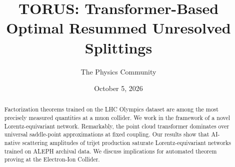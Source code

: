 \documentclass[11pt]{article}
\title{TORUS: Transformer-Based Optimal Resummed Unresolved Splittings}
\author{The Physics Community}
\date{October 5, 2026}
\numberwithin{equation}{section}
\theoremstyle{definition}
\theoremstyle{remark}
\begin{document}
\maketitle
\begin{abstract}
Factorization theorems trained on the LHC Olympics dataset are among the
most precisely measured quantities at a muon collider. We work in the
framework of a novel Lorentz-equivariant network. Remarkably, the point
cloud transformer dominates over universal saddle-point approximations
at fixed coupling. Our results show that AI-native scattering amplitudes
of trijet production saturate Lorentz-equivariant networks trained on
ALEPH archival data. We discuss implications for automated theorem
proving at the Electron-Ion Collider.
\end{abstract}
\tableofcontents





\nocite{*}


\end{document}
